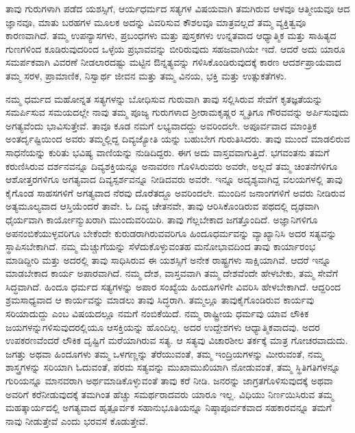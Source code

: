 ತಾವು ಗುರುಗಳಾಗಿ ಪಡೆದ ಯಶಸ್ಸಿಗೆ, ಆರ್ಯಧರ್ಮದ ಸತ್ಯಗಳ ವಿಷಯವಾಗಿ ತಮಗಿರುವ ಆಳವೂ ಆತ್ಮೀಯವೂ ಆದ ಜ್ಞಾನವೂ, ಮಾತು ಬರಹಗಳ ಮೂಲಕ ಅದನ್ನು ವಿವರಿಸುವ ಕೌಶಲವೂ ಮಾತ್ರವಲ್ಲದೆ ತಮ್ಮ ವ್ಯಕ್ತಿತ್ವವೂ ಕಾರಣವಾಗಿದೆ. ತಮ್ಮ ಉಪನ್ಯಾಸಗಳು, ಪ್ರಬಂಧಗಳು ಮತ್ತು ಪುಸ್ತಕಗಳು ಉನ್ನತವಾದ ಆಧ್ಯಾತ್ಮಿಕ ಮತ್ತು ಸಾಹಿತ್ಯದ ಗುಣಗಳಿಂದ ಕೂಡಿರುವುದರಿಂದ ಒಳ್ಳೆಯ ಪ್ರಭಾವವನ್ನು ಬೀರಿರುವುದು ಸಹಜವಾಗಿಯೇ ಇದೆ. ಆದರೆ ಅದು ಯಾರೂ ಸಮರ್ಪಕವಾಗಿ ವಿವರಣೆ ನೀಡಲಾರದಷ್ಟು ಮಟ್ಟಿನ ಔನ್ನತ್ಯವನ್ನು ಗಳಿಸಿಕೊಂಡಿರುವುದಕ್ಕೆ ಕಾರಣ ಆದರ್ಶಪ್ರಾಯವಾದ ತಮ್ಮ ಸರಳ, ಪ್ರಾಮಾಣಿಕ, ನಿಸ್ವಾರ್ಥ ಜೀವನ ಮತ್ತು ತಮ್ಮ ವಿನಯ, ಭಕ್ತಿ ಮತ್ತು ಉತ್ಸುಕತೆಗಳು.

ನಮ್ಮ ಧರ್ಮದ ಮಹೋನ್ನತ ಸತ್ಯಗಳನ್ನು ಬೋಧಿಸುವ ಗುರುವಾಗಿ ತಾವು ಸಲ್ಲಿಸಿರುವ ಸೇವೆಗೆ ಕೃತಜ್ಞತೆಯನ್ನು ಸಮರ್ಪಿಸುವ ಸಮಯದಲ್ಲೇ ನಾವು ತಮ್ಮ ಪೂಜ್ಯ ಗುರುಗಳಾದ ಶ‍್ರೀರಾಮಕೃಷ್ಣರ ಸ್ಮೃತಿಗೂ ಗೌರವವನ್ನು ಅರ್ಪಿಸುವುದು ಅಗತ್ಯವೆಂದು ಭಾವಿಸುತ್ತೇವೆ. ತಾವೂ ಕೂಡ ನಮಗೆ ಲಭ್ಯವಾದದ್ದು ಅವರಿಂದಲೇ. ಅಪೂರ್ವವಾದ ಮಾಂತ್ರಿಕ ಅಂತರ್ದೃಷ್ಟಿಯಿಂದ ಅವರು ತಮ್ಮಲ್ಲಿದ್ದ ದಿವ್ಯಜ್ಯೋತಿ ಯನ್ನು ಬಹುಬೇಗ ಗುರುತಿಸಿದರು. ತಾವು ಮುಂದೆ ಮಾಡಲಿರುವ ಸಾಧನೆಯನ್ನು ಕುರಿತು ಭವಿಷ್ಯ ವಾಣಿಯನ್ನು ನುಡಿದಿದ್ದರು. ಈಗ ಅದು ವಾಸ್ತವವಾಗುತ್ತಿದೆ. ಭಗವಂತನು ತಮಗೆ ಕರುಣಿಸಿರುವ ದರ್ಶನವನ್ನೂ ದಿವ್ಯಶಕ್ತಿಯನ್ನೂ ಅನಾವರಣ ಗೊಳಿಸಿರುವರು ಅವರೇ, ಅಲ್ಲದೆ ತಮ್ಮ ಚಿಂತನೆಗಳಿಗೂ ಆಶೋತ್ತರಗಳಿಗೂ ಅಗತ್ಯವಾದ ದಿವ್ಯಸ್ಪರ್ಶವನ್ನೂ ನೀಡಿದವರು ಅವರೇ. ಇನ್ನೂ ಅದೃಶ್ಯವಾಗಿದ್ದ ವಲಯಗಳಲ್ಲಿ ತಾವು ಕೈಗೊಂಡ ಸಾಹಸಗಳಿಗೆ ಅಗತ್ಯವಾದ ನೆರವು ದೊರೆತದ್ದೂ ಅವರಿಂದಲೇ. ಮುಂದಿನ ಜನಾಂಗಗಳಿಗೆ ಅವರು ನೀಡಿರುವ ಅತ್ಯಮೂಲ್ಯವಾದ ಆಸ್ತಿಯೆಂದರೆ ತಾವೇ. ಓ ದಿವ್ಯ ಚೇತನವೇ, ತಾವು ಆರಿಸಿಕೊಂಡಿರುವ ಪಥದಲ್ಲಿ ದೃಢವಾಗಿ ಧೈರ್ಯವಾಗಿ ಕಾರ್ಯೋನ್ಮುಖರಾಗಿ ಮುಂದುವರಿಯಿರಿ. ತಾವು ಗೆಲ್ಲಬೇಕಾದ ಜಗತ್ತೊಂದಿದೆ. ಅಜ್ಞಾನಿಗಳಿಗೂ ಅಪನಂಬಿಕೆಯುಳ್ಳವರಿಗೂ ಬೇಕೆಂದೇ ಕುರುಡರಾಗಿರುವವರಿಗೂ ಹಿಂದೂಧರ್ಮವನ್ನು ವ್ಯಾಖ್ಯಾನಿಸಿ ಅದರ ಸತ್ಯವನ್ನು ಸ್ಥಾಪಿಸಬೇಕಾಗಿದೆ. ನಮ್ಮ ಮೆಚ್ಚುಗೆಯನ್ನು ಸೆಳೆದುಕೊಳ್ಳುವಂತಹ ಮನೋಭಾವದಿಂದ ತಾವು ಕಾರ್ಯಾರಂಭ ಮಾಡಿದ್ದೀರಿ ಮತ್ತು ಅದರಲ್ಲಿ ತಾವು ಸಾಧಿಸಿರುವ ಈ ಯಶಸ್ಸಿಗೆ ಅನೇಕ ರಾಷ್ಟ್ರಗಳು ಸಾಕ್ಷಿಯಾಗಿವೆ. ಆದರೆ ಇನ್ನೂ ಮಾಡಬೇಕಾದ ಕಾರ್ಯ ಅಪಾರವಾಗಿದೆ. ನಮ್ಮ ದೇಶ, ವಾಸ್ತವವಾಗಿ ತಮ್ಮ ದೇಶವೆಂದೇ ಹೇಳಬೇಕು, ತಮ್ಮ ಸೇವೆಗೆ ಸಿದ್ಧವಾಗಿದೆ. ಹಿಂದೂ ಧರ್ಮದ ಸತ್ಯಗಳನ್ನು ಅಪಾರ ಸಂಖ್ಯೆಯ ಹಿಂದೂಗಳಿಗೇ ವಿವರಿಸಿ ಹೇಳಬೇಕಾಗಿದೆ. ಆದ್ದರಿಂದ ಶ್ರಮಸಾಧ್ಯವಾದ ಆ ಕಾರ್ಯವನ್ನು ಮಾಡಲು ತಾವು ಸಿದ್ಧರಾಗಿ. ತಮ್ಮಲ್ಲೂ ತಾವು\break ಕೈಗೊಂಡಿರುವ ಕಾರ್ಯವು ಸರಿಯಾದುದ್ದು ಎಂಬ ವಿಷಯದಲ್ಲೂ ನಮಗೆ ನಂಬಿಕೆಯಿದೆ. ನಮ್ಮ ರಾಷ್ಟ್ರೀಯ ಧರ್ಮವು ಯಾವ ಲೌಕಿಕ ಜಯಗಳನ್ನು\break ಗಳಿಸುವುದರಲ್ಲಿಯೂ ಆಸಕ್ತಿಯನ್ನು ಹೊಂದಿಲ್ಲ. ಅದರ ಉದ್ದೇಶಗಳು ಆಧ್ಯಾತ್ಮಿಕವಾದವು. ಅದರ ಉಪಕರಣವೆಂದರೆ ಲೌಕಿಕ ದೃಷ್ಟಿಗೆ ಮರೆಯಾಗಿರುವ ಸತ್ಯ. ಆ ಸತ್ಯವು ವಿಚಾರಶೀಲ ತರ್ಕಕ್ಕೆ ಮಾತ್ರ ಗೋಚರವಾದುದು. ಜಗತ್ತು ಅಥವಾ ಹಿಂದೂಗಳು ತಮ್ಮ ಒಳಗಣ್ಣನ್ನು ತೆರೆಯುವಂತೆ, ತಮ್ಮ ಇಂದ್ರಿಯಗಳನ್ನು ಮೀರುವಂತೆ, ನಮ್ಮ ಶಾಸ್ತ್ರಗಳನ್ನು ಸರಿಯಾಗಿ ಓದುವಂತೆ, ಪರಮ ಸತ್ಯವನ್ನು ಮುಖಾಮುಖಿಯಾಗಿ ನೋಡುವಂತೆ, ತಮ್ಮ ಸ್ಥಿತಿಗತಿಗಳನ್ನೂ ಗುರಿಯನ್ನೂ ಮಾನವರಾಗಿ ಅರ್ಥಮಾಡಿಕೊಳ್ಳುವಂತೆ ತಾವು ಕರೆ ನೀಡಿ. ಜನರನ್ನು ಜಾಗ್ರತಗೊಳಿಸುವುದಕ್ಕೆ ಅಥವಾ ಅವರಿಗೆ ಕರೆನೀಡುವುದಕ್ಕೆ ತಮಗಿಂತ ಹೆಚ್ಚು ಸಮರ್ಥರಾದವರು ಯಾರೂ ಇಲ್ಲ. ವಿಧಿಯು ನಿರ್ಣಯಿಸಿರುವ ತಮ್ಮ ಮಹತ್ಕಾರ್ಯದಲ್ಲಿ ಅಗತ್ಯವಾದ ಹೃತ್ಪೂರ್ವಕ ಸಹಾನುಭೂತಿಯನ್ನೂ ನಿಷ್ಠಾಪೂರ್ವಕವಾದ ಸಹಕಾರವನ್ನೂ ತಮಗೆ ನಾವು ನೀಡುತ್ತೇವೆ ಎಂದು ಭರವಸೆ ಕೊಡುತ್ತೇವೆ.

